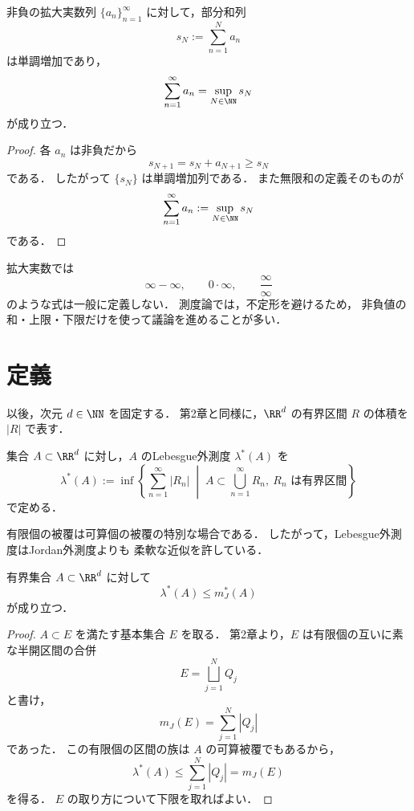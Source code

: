 \begin{proposition}
非負の拡大実数列 $\{a_n\}_{n=1}^{\infty}$ に対して，部分和列
\[
s_N:=\sum_{n=1}^N a_n
\]
は単調増加であり，
\[
\sum_{n=1}^{\infty} a_n=\sup_{N \in \NN} s_N
\]
が成り立つ．
\end{proposition}
\begin{proof}
各 $a_n$ は非負だから
\[
s_{N+1}=s_N+a_{N+1}\ge s_N
\]
である．
したがって $\{s_N\}$ は単調増加列である．
また無限和の定義そのものが
\[
\sum_{n=1}^{\infty} a_n:=\sup_{N \in \NN} s_N
\]
である．
\end{proof}

\begin{remark}
拡大実数では
\[
\infty-\infty,\qquad 0\cdot\infty,\qquad \frac{\infty}{\infty}
\]
のような式は一般に定義しない．
測度論では，不定形を避けるため，
非負値の和・上限・下限だけを使って議論を進めることが多い．
\end{remark}

\section{定義}

以後，次元 $d \in \NN$ を固定する．
第2章と同様に，$\RR^d$ の有界区間 $R$ の体積を $|R|$ で表す．

\begin{definition}[Lebesgue外測度]
集合 $A \subset \RR^d$ に対し，$A$ のLebesgue外測度 $\lambda^*(A)$ を
\[
\lambda^*(A)
:=
\inf\left\{
\sum_{n=1}^{\infty} |R_n|
\;\middle|\;
A \subset \bigcup_{n=1}^{\infty} R_n,\ 
R_n \text{ は有界区間}
\right\}
\]
で定める．
\end{definition}

\begin{remark}
有限個の被覆は可算個の被覆の特別な場合である．
したがって，Lebesgue外測度はJordan外測度よりも
柔軟な近似を許している．
\end{remark}

\begin{proposition}[Jordan外測度との比較]
有界集合 $A \subset \RR^d$ に対して
\[
\lambda^*(A) \le m_J^*(A)
\]
が成り立つ．
\end{proposition}
\begin{proof}
$A \subset E$ を満たす基本集合 $E$ を取る．
第2章より，$E$ は有限個の互いに素な半開区間の合併
\[
E = \bigsqcup_{j=1}^N Q_j
\]
と書け，
\[
m_J(E) = \sum_{j=1}^N |Q_j|
\]
であった．
この有限個の区間の族は $A$ の可算被覆でもあるから，
\[
\lambda^*(A) \le \sum_{j=1}^N |Q_j| = m_J(E)
\]
を得る．
$E$ の取り方について下限を取ればよい．
\end{proof}

